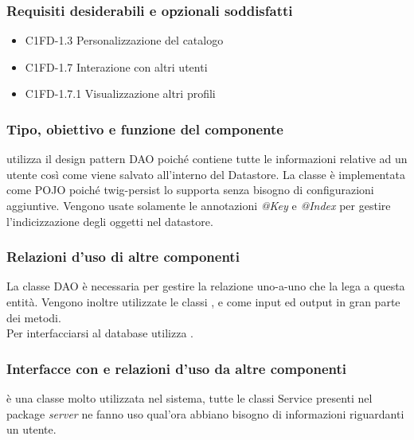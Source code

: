 \subsubsection*{Requisiti desiderabili e opzionali soddisfatti}
\begin{itemize}
    \item C1FD-1.3 Personalizzazione del catalogo
    \item C1FD-1.7 Interazione con altri utenti
    \item C1FD-1.7.1 Visualizzazione altri profili
\end{itemize}
\subsubsection*{Tipo, obiettivo e funzione del componente}
 utilizza il design pattern DAO poich\'e contiene tutte le
informazioni relative ad un utente cos\`i come viene salvato all'interno del
Datastore. La classe \`e implementata come POJO poich\'e twig-persist lo
supporta senza bisogno di configurazioni aggiuntive. Vengono usate solamente
le annotazioni \emph{@Key} e \emph{@Index} per gestire l'indicizzazione
degli oggetti nel datastore.\\
\subsubsection*{Relazioni d'uso di altre componenti} La classe DAO  \`e necessaria per gestire la relazione
uno-a-uno che la lega a questa entit\`a. Vengono inoltre utilizzate le classi
,  e  come
input ed output in gran parte dei metodi.\\
Per interfacciarsi al database utilizza . 
\subsubsection*{Interfacce con e relazioni d'uso da altre componenti}
 \`e una classe molto utilizzata nel sistema, tutte le classi
Service presenti nel package \emph{server} ne fanno uso qual'ora abbiano bisogno
di informazioni riguardanti un utente. 

